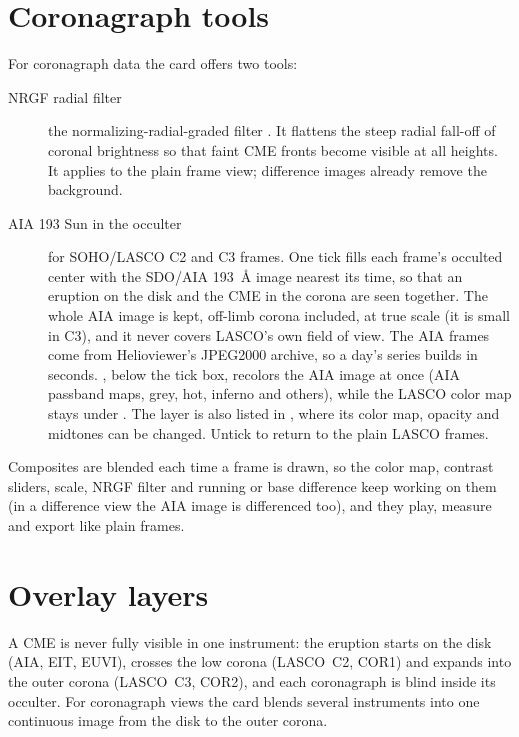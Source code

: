 \section{Coronagraph tools}
\label{sec:nrgf}

For coronagraph data the  card offers two tools:
\begin{description}
  \item[NRGF radial filter] the normalizing-radial-graded filter
    \parencite{morgan2006}. It flattens the steep radial fall-off of coronal brightness so that
    faint CME fronts become visible at all heights. It applies to the plain frame view;
    difference images already remove the background.
  \item[AIA 193 Sun in the occulter] for SOHO/LASCO C2 and
    C3 frames. One tick fills each frame's occulted center with the SDO/AIA 193~Å image nearest
    its time, so that an eruption on the disk and the CME in the corona are seen together. The whole AIA image is kept, off-limb corona included, at true
    scale (it is small in C3), and it never covers LASCO's own field of view. The AIA frames
    come from Helioviewer's JPEG2000 archive, so a day's series builds in seconds.
    , below the tick box, recolors the AIA image at once (AIA passband maps,
    grey, hot, inferno and others), while the LASCO color map stays under . The layer is also listed in , where its color map, opacity and
    midtones can be changed. Untick to return to the plain LASCO frames.
\end{description}

Composites are blended each time a frame is drawn, so the color map, contrast sliders, scale,
NRGF filter and running or base difference keep working on them (in a difference view the AIA
image is differenced too), and they play, measure and export like plain frames.

\section{Overlay layers}
\label{sec:overlay-layers}

A CME is never fully visible in one instrument: the eruption starts on the disk (AIA, EIT,
EUVI), crosses the low corona (LASCO~C2, COR1) and expands into the outer corona (LASCO~C3,
COR2), and each coronagraph is blind inside its occulter. For coronagraph views the
 card blends several instruments into one continuous image from the disk
to the outer corona.

